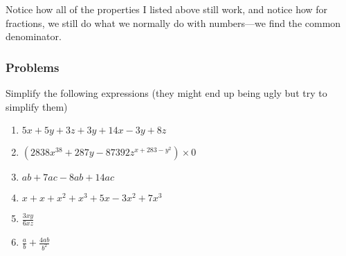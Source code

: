 Notice how all of the properties I listed above still work, and notice how for fractions, we still do what we normally do with numbers---we find the common denominator.

\subsubsection{Problems}
Simplify the following expressions (they might end up being ugly but try to simplify them)
\begin{enumerate}
\item $5x+5y+3z+3y+14x-3y+8z$
\item $(2838x^{38}+287y-87392z^{x+283-y^2})\times0$
\item $ab+7ac-8ab+14ac$
\item $x+x+x^{2}+x^{3}+5x-3x^2+7x^3$
\item $\frac{3xy}{6xz}$
\item $\frac{a}{b}+\frac{4ab}{b^2}$
\end{enumerate}